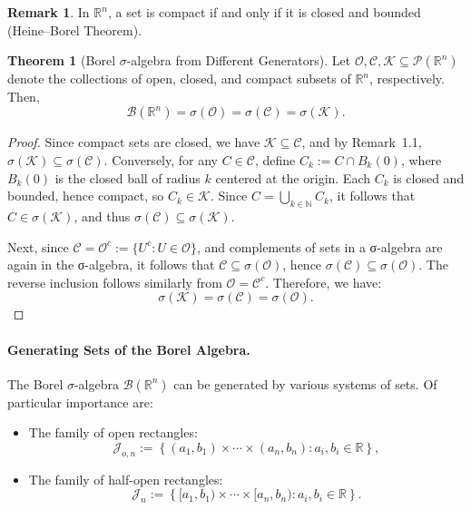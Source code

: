 \documentclass[12pt]{article}
\theoremstyle{definition}
\newtheorem{theorem}{Theorem}[section]
\newtheorem{remark}{Remark}[section]
\begin{document}
\medskip
\begin{remark}
In \( \mathbb{R}^n \), a set is compact if and only if it is closed and bounded (Heine–Borel Theorem).
\end{remark}

\medskip
\begin{theorem}[Borel $\sigma$-algebra from Different Generators]\label{thm:borel-generators}
Let \( \mathcal{O}, \mathcal{C}, \mathcal{K} \subseteq \mathcal{P}(\mathbb{R}^n) \) denote the collections of open, closed, and compact subsets of \( \mathbb{R}^n \), respectively. Then,
\[
\mathcal{B}(\mathbb{R}^n) = \sigma(\mathcal{O}) = \sigma(\mathcal{C}) = \sigma(\mathcal{K}).
\]
\end{theorem}

\begin{proof}
Since compact sets are closed, we have \( \mathcal{K} \subseteq \mathcal{C} \), and by Remark~1.1, \( \sigma(\mathcal{K}) \subseteq \sigma(\mathcal{C}) \). Conversely, for any \( C \in \mathcal{C} \), define \( C_k := C \cap B_k(0) \), where \( B_k(0) \) is the closed ball of radius \( k \) centered at the origin. Each \( C_k \) is closed and bounded, hence compact, so \( C_k \in \mathcal{K} \). Since \( C = \bigcup_{k \in \mathbb{N}} C_k \), it follows that \( C \in \sigma(\mathcal{K}) \), and thus \( \sigma(\mathcal{C}) \subseteq \sigma(\mathcal{K}) \).

Next, since \( \mathcal{C} = \mathcal{O}^c := \{ U^c : U \in \mathcal{O} \} \), and complements of sets in a σ-algebra are again in the σ-algebra, it follows that \( \mathcal{C} \subseteq \sigma(\mathcal{O}) \), hence \( \sigma(\mathcal{C}) \subseteq \sigma(\mathcal{O}) \). The reverse inclusion follows similarly from \( \mathcal{O} = \mathcal{C}^c \). Therefore, we have:
\[
\sigma(\mathcal{K}) = \sigma(\mathcal{C}) = \sigma(\mathcal{O}).
\]
\end{proof}

\paragraph{Generating Sets of the Borel Algebra.}
The Borel $\sigma$-algebra $\mathcal{B}(\mathbb{R}^n)$ can be generated by various systems of sets. Of particular importance are:

\begin{itemize}
    \item The family of open rectangles:
    \[
    \mathcal{J}_{o,n} := \left\{ (a_1, b_1) \times \cdots \times (a_n, b_n) : a_i, b_i \in \mathbb{R} \right\},
    \]
    \item The family of half-open rectangles:
    \[
    \mathcal{J}_n := \left\{ [a_1, b_1) \times \cdots \times [a_n, b_n) : a_i, b_i \in \mathbb{R} \right\}.
    \]
\end{itemize}
\end{document}
